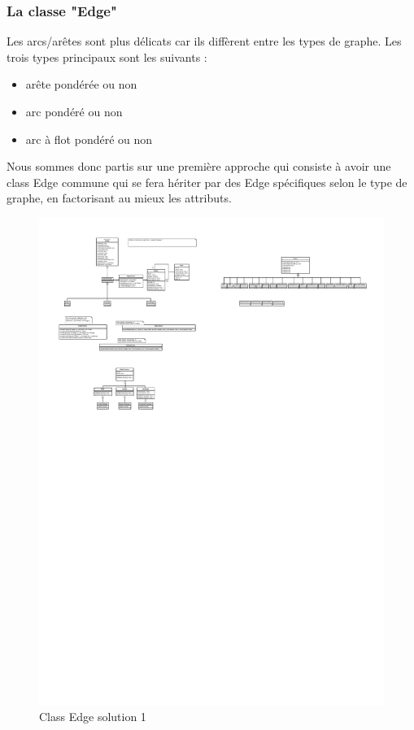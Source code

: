\documentclass[french]{article}
\begin{document}
			\subsubsection{La classe "Edge"}
			Les arcs/arêtes sont plus délicats car ils diffèrent entre les types de graphe. Les trois types principaux sont les suivants :
			\begin{itemize}
				\item arête pondérée ou non
				\item arc pondéré ou non
				\item arc à flot pondéré ou non
			\end{itemize}
			
			Nous sommes donc partis sur une première approche qui consiste à avoir une class Edge commune qui se fera hériter par des Edge spécifiques selon le type de graphe, en factorisant au mieux les attributs.
			\begin{figure}[H]
				\centering
				\includegraphics[scale=3.0]{Conception/classedgesol1.pdf}
				\caption{Class Edge solution 1}
			\end{figure}
\end{document}
